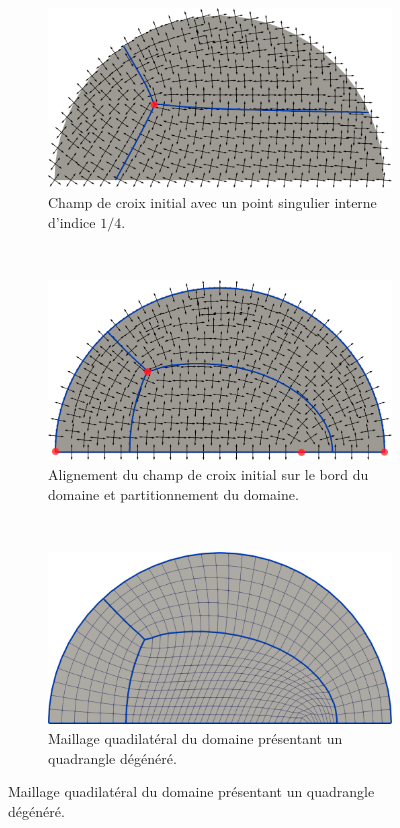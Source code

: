 \begin{figure}[!h]
\centering
\begin{subfigure}{0.65\textwidth}
    \includegraphics[width=\textwidth]{images/demi_disc_first_phi_first.pdf}
    \caption{Champ de croix initial avec un point singulier interne d'indice $1/4$.}
    \label{fig:demi_disc_first_cond_phi_first}
\end{subfigure}
\\[0.4cm]
\begin{subfigure}{0.65\textwidth}
    \includegraphics[width=\textwidth]{images/demi_disc_first_phi_second.pdf}
    \caption{Alignement du champ de croix initial sur le bord du domaine et partitionnement du domaine.}
    \label{fig:demi_disc_first_cond_phi_second}
\end{subfigure}
\\[0.4cm]
\begin{subfigure}{0.65\textwidth}
    \includegraphics[width=\textwidth]{images/demi_disc_first_phi_third.pdf}
    \caption{Maillage quadilatéral du domaine présentant un quadrangle dégénéré.}
    \label{fig:demi_disc_first_cond_phi_third}
\end{subfigure}


\end{figure}
